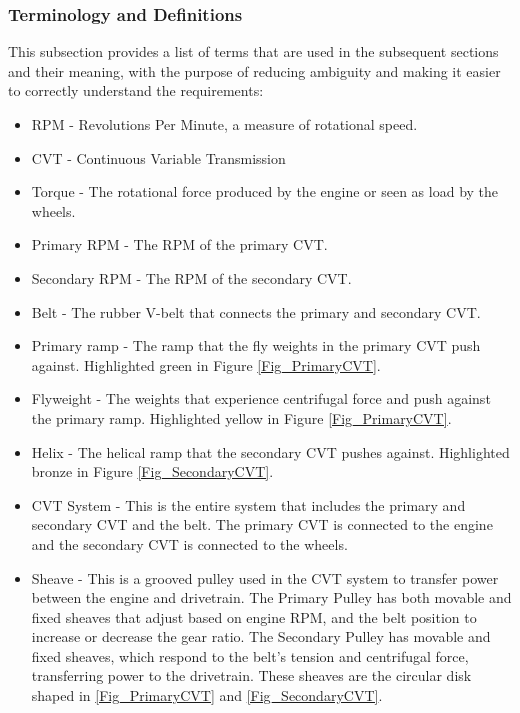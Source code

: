 \documentclass[12pt]{article}
\begin{document}
\subsubsection{Terminology and  Definitions}

This subsection provides a list of terms that are used in the subsequent
sections and their meaning, with the purpose of reducing ambiguity and making it
easier to correctly understand the requirements:

\begin{itemize}
  \item RPM - Revolutions Per Minute, a measure of rotational speed.
  \item CVT - Continuous Variable Transmission
  \item Torque - The rotational force produced by the engine or seen as load by the wheels. 
  \item Primary RPM - The RPM of the primary CVT.
  \item Secondary RPM - The RPM of the secondary CVT.
  \item Belt - The rubber V-belt that connects the primary and secondary CVT.
  \item Primary ramp - The ramp that the fly weights in the primary CVT push against. Highlighted green in Figure \ref{Fig_PrimaryCVT}.
  \item Flyweight - The weights that experience centrifugal force and push against the primary ramp. Highlighted yellow in Figure \ref{Fig_PrimaryCVT}.
  \item Helix - The helical ramp that the secondary CVT pushes against. Highlighted bronze in Figure \ref{Fig_SecondaryCVT}.
  \item CVT System - This is the entire system that includes the primary and secondary CVT and the belt. The primary CVT is connected to the engine and the secondary CVT is connected to the wheels.
  \item Sheave - This is a grooved pulley used in the CVT system to transfer power between the engine and drivetrain. 
  The Primary Pulley has both movable and fixed sheaves that adjust based on engine RPM, and the belt position to increase or decrease the gear ratio.
  The Secondary Pulley has movable and fixed sheaves, which respond to the belt's tension and centrifugal force, transferring power to the drivetrain.
  These sheaves are the circular disk shaped in \ref{Fig_PrimaryCVT} and \ref{Fig_SecondaryCVT}.
\end{itemize}
\end{document}
